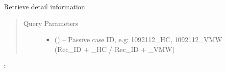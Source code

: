 \documentclass[letterpaper,10pt,english,openany,oneside]{sphinxmanual}
\begin{document}
\begin{fulllineitems}
\label{\detokenize{api/v4:get--api4-ReactiveCase-detail}}
\sphinxAtStartPar
Retrieve detail information
\begin{quote}\begin{description}
\item[{Query Parameters}] \leavevmode\begin{itemize}
\item {} 
\sphinxAtStartPar
{} () – Passive case ID, e.g: 1092112\_HC, 1092112\_VMW (Rec\_ID + \_HC / Rec\_ID + \_VMW)

\end{itemize}

\end{description}\end{quote}

\sphinxAtStartPar
{}:


\end{fulllineitems}
\end{document}
